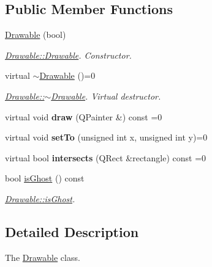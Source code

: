 \subsection*{Public Member Functions}
\begin{DoxyCompactItemize}
\item 
\hyperlink{classDrawable_af63902e4fe7ec2aef7ad56eec0168822}{Drawable} (bool)
\begin{DoxyCompactList}\small\item\em \hyperlink{classDrawable_af63902e4fe7ec2aef7ad56eec0168822}{Drawable\-::\-Drawable}. Constructor. \end{DoxyCompactList}\item 
\hypertarget{classDrawable_abf4d2776b43b2bd93710591926587934}{virtual \hyperlink{classDrawable_abf4d2776b43b2bd93710591926587934}{$\sim$\-Drawable} ()=0}\label{classDrawable_abf4d2776b43b2bd93710591926587934}

\begin{DoxyCompactList}\small\item\em \hyperlink{classDrawable_abf4d2776b43b2bd93710591926587934}{Drawable\-::$\sim$\-Drawable}. Virtual destructor. \end{DoxyCompactList}\item 
\hypertarget{classDrawable_ab5e74918b6cf0149cb192b9ec56556c1}{virtual void {\bfseries draw} (Q\-Painter \&) const =0}\label{classDrawable_ab5e74918b6cf0149cb192b9ec56556c1}

\item 
\hypertarget{classDrawable_a8fa095e72a5b0a60488ac977bf77a34b}{virtual void {\bfseries set\-To} (unsigned int x, unsigned int y)=0}\label{classDrawable_a8fa095e72a5b0a60488ac977bf77a34b}

\item 
\hypertarget{classDrawable_a81d6ed7b86df48ec36e731b377b066cf}{virtual bool {\bfseries intersects} (Q\-Rect \&rectangle) const =0}\label{classDrawable_a81d6ed7b86df48ec36e731b377b066cf}

\item 
bool \hyperlink{classDrawable_a631734def2897ecb976b725a5d4fd554}{is\-Ghost} () const 
\begin{DoxyCompactList}\small\item\em \hyperlink{classDrawable_a631734def2897ecb976b725a5d4fd554}{Drawable\-::is\-Ghost}. \end{DoxyCompactList}\end{DoxyCompactItemize}


\subsection{Detailed Description}
The \hyperlink{classDrawable}{Drawable} class. 

